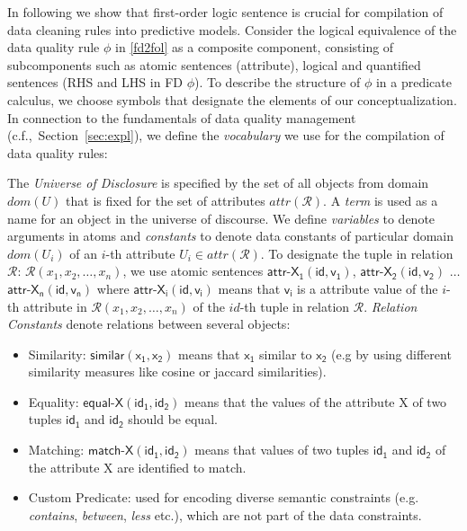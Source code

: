 In following we show that first-order logic sentence is crucial for compilation of data cleaning rules into predictive models. %
Consider the logical equivalence of the data quality rule $\phi$ in \ref{fd2fol} as a composite component, consisting of subcomponents such as atomic sentences (attribute), logical and quantified sentences (RHS and LHS in FD $\phi$). To describe the structure of $\phi$ in a predicate calculus, we choose symbols that designate the elements of our conceptualization. In connection to the fundamentals of data quality management (c.f.,~Section~\ref{sec:expl}), we define the \textit{vocabulary} we use for the compilation of data quality rules: 

The \textit{Universe of Disclosure} is specified by the set of all objects from domain $dom(U)$ that is fixed for the set of attributes $attr(\mathcal{R})$. A \textit{term} is used as a name for an object in the universe of discourse. We define \textit{variables} to denote arguments in atoms and \textit{constants} to denote data constants of particular domain $dom(U_i)$ of an $i$-th attribute $U_i \in attr(\mathcal{R})$. To designate the tuple in relation $\mathcal{R}$: $\mathcal{R}(x_1,x_2, \dots , x_n)$, we use atomic sentences $\mathsf{\textsf{attr-X}_1(id,v_1)}$, $\mathsf{\textsf{attr-X}_2(id,v_2)}$ $\dots$ $\mathsf{\textsf{attr-X}_n(id,v_n)}$ where $\mathsf{\textsf{attr-X}_i(id,v_i)}$ means that $\mathsf{v_i}$ is a attribute value of the $i$-th attribute in $\mathcal{R}(x_1,x_2, \dots , x_n)$ of the $id$-th tuple in relation $\mathcal{R}$. \textit{Relation Constants} denote relations between several objects:
	\begin{itemize}
		\item Similarity: $\mathsf{\textsf{similar}(x_1,x_2)}$ means that $\mathsf{x_1}$ similar to $\mathsf{x_2}$ (e.g by using different similarity measures like cosine or jaccard similarities).
		\item Equality: $\mathsf{\textsf{equal-X}(id_1, id_2)}$ means that the values of the attribute X of two tuples $\mathsf{id_1}$ and $\mathsf{id_2}$ should be equal.
		\item Matching: $\mathsf{\textsf{match-X}(id_1, id_2)}$ means that values of two tuples $\mathsf{id_1}$ and $\mathsf{id_2}$ of the attribute X are identified to match.
		\item Custom Predicate: used for encoding diverse semantic constraints (e.g. \textit{contains}, \textit{between}, \textit{less} etc.), which are not part of the data constraints.
	\end{itemize}

